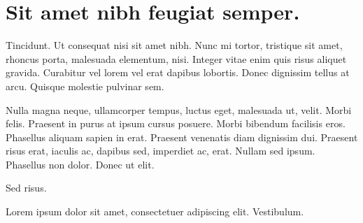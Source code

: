 \section{Sit amet nibh feugiat semper.}

Tincidunt. Ut consequat nisi sit amet nibh. Nunc mi tortor, tristique
sit amet, rhoncus porta, malesuada elementum, nisi. Integer vitae enim
quis risus aliquet gravida. Curabitur vel lorem vel erat dapibus
lobortis. Donec dignissim tellus at arcu. Quisque molestie pulvinar
sem. \cite[p.~42]{latexcompanion}

Nulla magna neque, ullamcorper tempus, luctus eget, malesuada ut,
velit. Morbi felis. Praesent in purus at ipsum cursus posuere. Morbi
bibendum facilisis eros. Phasellus aliquam sapien in erat. Praesent
venenatis diam dignissim dui. Praesent risus erat, iaculis ac, dapibus
sed, imperdiet ac, erat. Nullam sed ipsum. Phasellus non dolor. Donec
ut elit.

Sed risus.

Lorem ipsum dolor sit amet, consectetuer adipiscing elit. Vestibulum.

